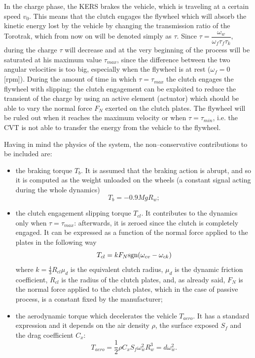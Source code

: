 \documentclass[11pt]{article}
\begin{document}
In the charge phase, the KERS brakes the vehicle, which is traveling at a certain speed $v_0$. This means that the clutch engages the flywheel which will absorb the kinetic energy lost by the vehicle by changing the transmission ratio of the Torotrak, which from now on will be denoted simply as $\tau$. Since $\tau = \dfrac{\omega_w}{\omega_f \tau_f \tau_k}$, during the charge $\tau$ will decrease and at the very beginning of the process will be saturated at his maximum value $\tau_{max}$, since the difference between the two angular velocities is too big, especially when the flywheel is at rest ($\omega_f = 0$ [rpm]). During the amount of time in which $\tau = \tau_{max}$ the clutch engages the flywheel with slipping: the clutch engagement can be exploited to reduce the transient of the charge by using an active element (actuator) which should be able to vary the normal force $F_N$ exerted on the clutch plates. The flywheel will be ruled out when it reaches the maximum velocity or when $\tau = \tau_{min}$, i.e. the CVT is not able to transfer the energy from the vehicle to the flywheel.

Having in mind the physics of the system, the non--conservative contributions to be included are:
\begin{itemize}
\item the braking torque $T_b$. It is assumed that the braking action is abrupt, and so it is computed as the weight unloaded on the wheels (a constant signal acting during the whole dynamics)
\begin{equation}
T_b = - 0.9 M g R_w; 
\label{braking_torque}
\end{equation}
    
\item the clutch engagement slipping torque $T_{cl}$. It contributes to the dynamics only when $\tau = \tau_{max}$: afterwards, it is zeroed since the clutch is completely engaged. It can be expressed as a function of the normal force applied to the plates in the following way \cite{clutch}
\begin{equation}
T_{cl} = kF_N \textup{sgn} (\omega_{cv} - \omega_{ck})
\label{clutch_torque}
\end{equation}
where $k = \frac{4}{3}R_{cl} \mu_d$ is the equivalent clutch radius, $\mu_d$ is the dynamic friction coefficient, $R_{cl}$ is the radius of the clutch plates, and, as already said, $F_N$ is the normal force applied to the clutch plates, which in the case of passive process, is a constant fixed by the manufacturer;
\item the aerodynamic torque which decelerates the vehicle $T_{aero}$. It has a standard expression and it depends on the air density $\rho$, the surface exposed $S_f$ and the drag coefficient $C_x$:
\begin{equation}
T_{aero} = \dfrac{1}{2}\rho C_x S_f \omega_w^2 R_w^3 = d\omega_w^2.
\label{aero_torque}
\end{equation}
\end{itemize}
\end{document}
